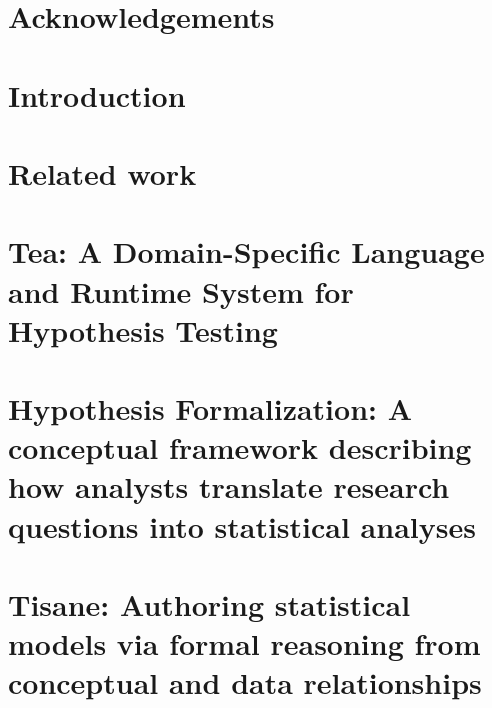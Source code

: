 \documentclass[11pt]{book}
\begin{document}
% 






{} %



\chapter*{Acknowledgements}



\tableofcontents{}
\listoffigures
\listoftables
\clearpage

\chapter {Introduction}


\chapter {Related work}
\label{chapter:relatedWork}


\chapter{Tea: A Domain-Specific Language and Runtime System for Hypothesis Testing} %
\label{chapter:tea}


\chapter{Hypothesis Formalization: A conceptual framework describing how analysts translate research questions into statistical analyses} %
\label{chapter:hypoForm}


\chapter{Tisane: Authoring statistical models via formal reasoning from conceptual and data relationships}
\label{chapter:tisane}


% 
\end{document}
